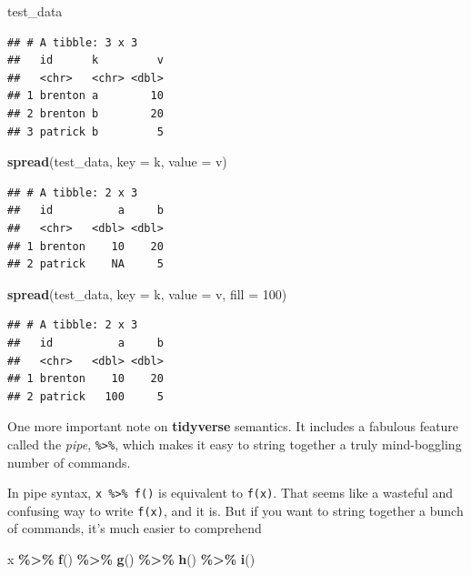\documentclass[
  12pt,
  oneside,openany]{book}
\newenvironment{Shaded}{\begin{snugshade}}{\end{snugshade}}
\newcommand{\DataTypeTok}[1]{\textcolor[rgb]{0.13,0.29,0.53}{#1}}
\newcommand{\DecValTok}[1]{\textcolor[rgb]{0.00,0.00,0.81}{#1}}
\newcommand{\KeywordTok}[1]{\textcolor[rgb]{0.13,0.29,0.53}{\textbf{#1}}}
\newcommand{\NormalTok}[1]{#1}
\newcommand{\OperatorTok}[1]{\textcolor[rgb]{0.81,0.36,0.00}{\textbf{#1}}}
\newcommand{\StringTok}[1]{\textcolor[rgb]{0.31,0.60,0.02}{#1}}
\begin{document}
\begin{Shaded}
\begin{Highlighting}[]
\NormalTok{test\_data}
\end{Highlighting}
\end{Shaded}

\begin{verbatim}
## # A tibble: 3 x 3
##   id      k         v
##   <chr>   <chr> <dbl>
## 1 brenton a        10
## 2 brenton b        20
## 3 patrick b         5
\end{verbatim}

\begin{Shaded}
\begin{Highlighting}[]
\KeywordTok{spread}\NormalTok{(test\_data, }\DataTypeTok{key =}\NormalTok{ k, }\DataTypeTok{value =}\NormalTok{ v)}
\end{Highlighting}
\end{Shaded}

\begin{verbatim}
## # A tibble: 2 x 3
##   id          a     b
##   <chr>   <dbl> <dbl>
## 1 brenton    10    20
## 2 patrick    NA     5
\end{verbatim}

\begin{Shaded}
\begin{Highlighting}[]
\KeywordTok{spread}\NormalTok{(test\_data, }\DataTypeTok{key =}\NormalTok{ k, }\DataTypeTok{value =}\NormalTok{ v, }\DataTypeTok{fill =} \DecValTok{100}\NormalTok{)}
\end{Highlighting}
\end{Shaded}

\begin{verbatim}
## # A tibble: 2 x 3
##   id          a     b
##   <chr>   <dbl> <dbl>
## 1 brenton    10    20
## 2 patrick   100     5
\end{verbatim}

One more important note on \textbf{tidyverse} semantics. It includes a fabulous feature called the \emph{pipe}, \texttt{\%\textgreater{}\%}, which makes it easy to string together a truly mind-boggling number of commands.

In pipe syntax, \texttt{x\ \%\textgreater{}\%\ f()} is equivalent to \texttt{f(x)}. That seems like a wasteful and confusing way to write \texttt{f(x)}, and it is. But if you want to string together a bunch of commands, it's much easier to comprehend

\begin{Shaded}
\begin{Highlighting}[]
\NormalTok{x }\OperatorTok{\%>\%}
\StringTok{  }\KeywordTok{f}\NormalTok{() }\OperatorTok{\%>\%}
\StringTok{  }\KeywordTok{g}\NormalTok{() }\OperatorTok{\%>\%}
\StringTok{  }\KeywordTok{h}\NormalTok{() }\OperatorTok{\%>\%}
\StringTok{  }\KeywordTok{i}\NormalTok{()}
\end{Highlighting}
\end{Shaded}
\end{document}
